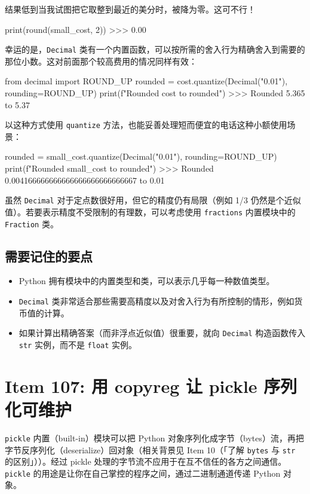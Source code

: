 结果低到当我试图把它取整到最近的美分时，被降为零。这可不行！

\begin{codebox}[python]
print(round(small_cost, 2))
>>>
0.00
\end{codebox}

幸运的是，\texttt{Decimal} 类有一个内置函数，可以按所需的舍入行为精确舍入到需要的那位小数。这对前面那个较高费用的情况同样有效：

\begin{codebox}[python]
from decimal import ROUND_UP
rounded = cost.quantize(Decimal("0.01"), rounding=ROUND_UP)
print(f"Rounded {cost} to {rounded}")
>>>
Rounded 5.365 to 5.37
\end{codebox}

以这种方式使用 \texttt{quantize} 方法，也能妥善处理短而便宜的电话这种小额使用场景：

\begin{codebox}[python]
rounded = small_cost.quantize(Decimal("0.01"),
rounding=ROUND_UP)
print(f"Rounded {small_cost} to {rounded}")
>>>
Rounded 0.004166666666666666666666666667 to 0.01
\end{codebox}

虽然 \texttt{Decimal} 对于定点数很好用，但它的精度仍有局限（例如 1/3 仍然是个近似值）。若要表示精度不受限制的有理数，可以考虑使用 \texttt{fractions} 内置模块中的 \texttt{Fraction} 类。

\subsection{需要记住的要点}

\begin{itemize}
\item Python 拥有模块中的内置类型和类，可以表示几乎每一种数值类型。
\item \texttt{Decimal} 类非常适合那些需要高精度以及对舍入行为有所控制的情形，例如货币值的计算。
\item 如果计算出精确答案（而非浮点近似值）很重要，就向 \texttt{Decimal} 构造函数传入 \texttt{str} 实例，而不是 \texttt{float} 实例。
\end{itemize}

\section{Item 107: 用 copyreg 让 pickle 序列化可维护}

\texttt{pickle} 内置（built-in）模块可以把 Python 对象序列化成字节（bytes）流，再把字节反序列化（deserialize）回对象（相关背景见 Item 10（「了解 \texttt{bytes} 与 \texttt{str} 的区别」））。经过 pickle 处理的字节流不应用于在互不信任的各方之间通信。\texttt{pickle} 的用途是让你在自己掌控的程序之间，通过二进制通道传递 Python 对象。


